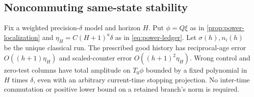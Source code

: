 \subsection{Noncommuting same-state stability}
\begin{proposition}\label{prop:power-counter-stability}
Fix a weighted precision-$\delta$ model and horizon $H$. Put $\phi=Q\xi$ as in \cref{prop:power-localization} and $\eta_H=C(H+1)^a\delta$ as in \eqref{eq:power-ledger}. Let $\sigma(h),n_i(h)$ be the unique classical run. The prescribed good history has reciprocal-age error $O((h+1)\eta_H)$ and scaled-counter error $O((h+1)^2\eta_H)$. Wrong control and zero-test columns have total amplitude on $T_0\phi$ bounded by a fixed polynomial in $H$ times $\delta$, even with an arbitrary current-time stopping projection. No inter-time commutation or positive lower bound on a retained branch's norm is required.
\end{proposition}
